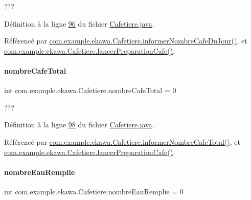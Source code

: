 ??? 



Définition à la ligne \hyperlink{_cafetiere_8java_source_l00096}{96} du fichier \hyperlink{_cafetiere_8java_source}{Cafetiere.\+java}.



Référencé par \hyperlink{_cafetiere_8java_source_l00326}{com.\+example.\+ekawa.\+Cafetiere.\+informer\+Nombre\+Cafe\+Du\+Jour()}, et \hyperlink{_cafetiere_8java_source_l00527}{com.\+example.\+ekawa.\+Cafetiere.\+lancer\+Preparation\+Cafe()}.

\mbox{\label{classcom_1_1example_1_1ekawa_1_1_cafetiere_ac22f9da8ed59c7362871b8f22e501e23}} 
\paragraph{\texorpdfstring{nombre\+Cafe\+Total}{nombreCafeTotal}}
{\footnotesize\ttfamily int com.\+example.\+ekawa.\+Cafetiere.\+nombre\+Cafe\+Total = 0\hspace{0.3cm}{\ttfamily [private]}}



??? 



Définition à la ligne \hyperlink{_cafetiere_8java_source_l00098}{98} du fichier \hyperlink{_cafetiere_8java_source}{Cafetiere.\+java}.



Référencé par \hyperlink{_cafetiere_8java_source_l00348}{com.\+example.\+ekawa.\+Cafetiere.\+informer\+Nombre\+Cafe\+Total()}, et \hyperlink{_cafetiere_8java_source_l00527}{com.\+example.\+ekawa.\+Cafetiere.\+lancer\+Preparation\+Cafe()}.

\mbox{\label{classcom_1_1example_1_1ekawa_1_1_cafetiere_a2332c2e33acff5084b4571663b48bd89}} 
\paragraph{\texorpdfstring{nombre\+Eau\+Remplie}{nombreEauRemplie}}
{\footnotesize\ttfamily int com.\+example.\+ekawa.\+Cafetiere.\+nombre\+Eau\+Remplie = 0\hspace{0.3cm}{\ttfamily [private]}}



